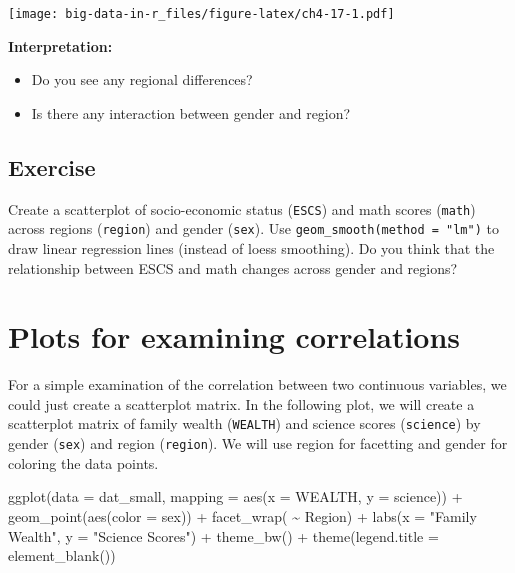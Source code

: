 \documentclass[
]{book}
\newenvironment{Shaded}{\begin{snugshade}}{\end{snugshade}}
\newcommand{\AttributeTok}[1]{\textcolor[rgb]{0.77,0.63,0.00}{#1}}
\newcommand{\FunctionTok}[1]{\textcolor[rgb]{0.00,0.00,0.00}{#1}}
\newcommand{\NormalTok}[1]{#1}
\newcommand{\SpecialCharTok}[1]{\textcolor[rgb]{0.00,0.00,0.00}{#1}}
\newcommand{\StringTok}[1]{\textcolor[rgb]{0.31,0.60,0.02}{#1}}
\providecommand{\tightlist}{%
  \setlength{\itemsep}{0pt}\setlength{\parskip}{0pt}}
\begin{document}
\texttt{[image: big-data-in-r\_files/figure-latex/ch4-17-1.pdf]}

\textbf{Interpretation:}

\begin{itemize}
\tightlist
\item
  Do you see any regional differences?
\item
  Is there any interaction between gender and region?
\end{itemize}

\hypertarget{exercise-1}{%
\subsection{Exercise}\label{exercise-1}}

Create a scatterplot of socio-economic status (\texttt{ESCS}) and math scores (\texttt{math}) across regions (\texttt{region}) and gender (\texttt{sex}). Use \texttt{geom\_smooth(method\ =\ "lm")} to draw linear regression lines (instead of loess smoothing). Do you think that the relationship between ESCS and math changes across gender and regions?

\hypertarget{plots-for-examining-correlations}{%
\section{Plots for examining correlations}\label{plots-for-examining-correlations}}

For a simple examination of the correlation between two continuous variables, we could just create a scatterplot matrix. In the following plot, we will create a scatterplot matrix of family wealth (\texttt{WEALTH}) and science scores (\texttt{science}) by gender (\texttt{sex}) and region (\texttt{region}). We will use region for facetting and gender for coloring the data points.

\begin{Shaded}
\begin{Highlighting}[]
\FunctionTok{ggplot}\NormalTok{(}\AttributeTok{data =}\NormalTok{ dat\_small,}
       \AttributeTok{mapping =} \FunctionTok{aes}\NormalTok{(}\AttributeTok{x =}\NormalTok{ WEALTH, }\AttributeTok{y =}\NormalTok{ science)) }\SpecialCharTok{+}
  \FunctionTok{geom\_point}\NormalTok{(}\FunctionTok{aes}\NormalTok{(}\AttributeTok{color =}\NormalTok{ sex)) }\SpecialCharTok{+}
  \FunctionTok{facet\_wrap}\NormalTok{( }\SpecialCharTok{\textasciitilde{}}\NormalTok{ Region) }\SpecialCharTok{+}
  \FunctionTok{labs}\NormalTok{(}\AttributeTok{x =} \StringTok{"Family Wealth"}\NormalTok{, }\AttributeTok{y =} \StringTok{"Science Scores"}\NormalTok{) }\SpecialCharTok{+}
  \FunctionTok{theme\_bw}\NormalTok{() }\SpecialCharTok{+}
  \FunctionTok{theme}\NormalTok{(}\AttributeTok{legend.title =} \FunctionTok{element\_blank}\NormalTok{())}
\end{Highlighting}
\end{Shaded}
\end{document}
